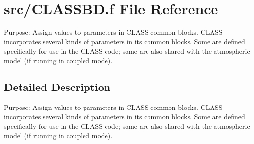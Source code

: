 \hypertarget{CLASSBD_8f}{}\section{src/\+C\+L\+A\+S\+S\+B\+D.f File Reference}
\label{CLASSBD_8f}


Purpose\+: Assign values to parameters in C\+L\+A\+S\+S common blocks. C\+L\+A\+S\+S incorporates several kinds of parameters in its common blocks. Some are defined specifically for use in the C\+L\+A\+S\+S code; some are also shared with the atmospheric model (if running in coupled mode).  




\subsection{Detailed Description}
Purpose\+: Assign values to parameters in C\+L\+A\+S\+S common blocks. C\+L\+A\+S\+S incorporates several kinds of parameters in its common blocks. Some are defined specifically for use in the C\+L\+A\+S\+S code; some are also shared with the atmospheric model (if running in coupled mode). 

